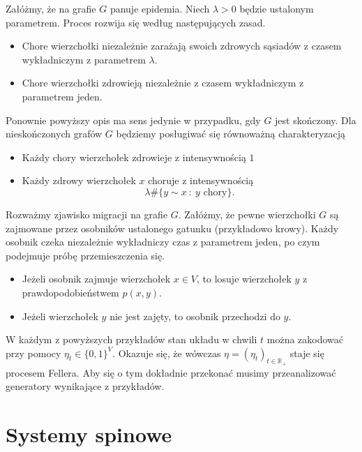 \documentclass{article}
\begin{document}
\begin{pd}
	Załóżmy, że na grafie $G$ panuje epidemia. Niech $\lambda >0$ będzie ustalonym parametrem.
	Proces rozwija się według następujących zasad.
	\begin{itemize}
		\item Chore wierzchołki niezależnie 
			zarażają swoich zdrowych sąsiadów z czasem wykładniczym 
			z parametrem $\lambda$.
		\item Chore wierzchołki zdrowieją niezależnie z czasem 
			wykładniczym z parametrem jeden.
	\end{itemize}
	Ponownie powyższy opis ma sens jedynie w przypadku, gdy $G$ jest skończony.
	Dla nieskończonych grafów $G$ będziemy posługiwać się równoważną charakteryzacją
	\begin{itemize}
		\item Każdy chory wierzchołek zdrowieje z intensywnością $1$
		\item Każdy zdrowy wierzchołek $x$ choruje z intensywnością 
			\begin{equation*}
				\lambda \# \{ y\sim x \: : \: y \mbox{ chory}\}.
			\end{equation*}
	\end{itemize}
\end{pd}

\begin{pd}
	Rozważmy zjawisko migracji na grafie $G$. Załóżmy, że pewne wierzchołki $G$ są zajmowane 
	przez osobników ustalonego gatunku (przykładowo krowy). Każdy osobnik
	czeka niezależnie wykładniczy czas z parametrem jeden, po czym podejmuje próbę 
	przemieszczenia się. 
	\begin{itemize}
		\item Jeżeli osobnik zajmuje wierzchołek $x \in V$, to losuje wierzchołek $y$ 
			z prawdopodobieństwem $p(x,y)$.
		\item Jeżeli wierzchołek $y$ nie jest zajęty, to osobnik przechodzi do $y$.	
	\end{itemize}
\end{pd}

W każdym z powyższych przykładów stan układu w chwili $t$ można zakodować przy pomocy 
$\eta_t \in \{ 0,1\}^V$. Okazuje się, że wówczas $\eta = (\eta_t)_{t \in \mathbb{R}_+}$
staje się procesem Fellera. Aby się o tym dokładnie przekonać musimy przeanalizować
generatory wynikające z przykładów.

\section{Systemy spinowe}
\end{document}
